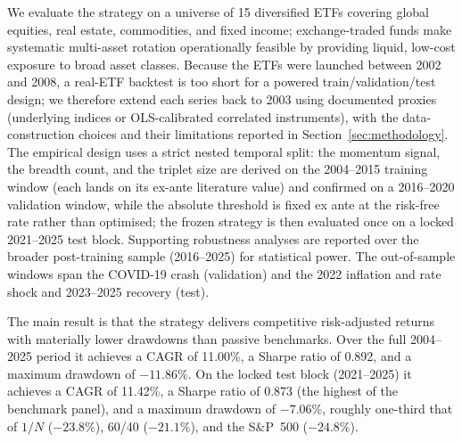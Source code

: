 We evaluate the strategy on a universe of 15 diversified ETFs covering global
equities, real estate, commodities, and fixed income; exchange-traded funds make
systematic multi-asset rotation operationally feasible by providing liquid,
low-cost exposure to broad asset classes.
Because the ETFs were launched between 2002 and 2008, a real-ETF backtest is too
short for a powered train/validation/test design; we therefore extend each series
back to 2003 using documented proxies (underlying indices or OLS-calibrated
correlated instruments), with the data-construction choices and their limitations
reported in Section~\ref{sec:methodology}.
The empirical design uses a strict nested temporal split: the momentum signal, the
breadth count, and the triplet size are derived on the 2004--2015 training window
(each lands on its ex-ante literature value) and confirmed on a 2016--2020
validation window, while the absolute threshold is fixed ex ante at the risk-free
rate rather than optimised; the frozen strategy is then evaluated once on a locked
2021--2025 test block. Supporting robustness analyses are reported over the broader
post-training sample (2016--2025) for statistical power.
The out-of-sample windows span the COVID-19 crash (validation) and the 2022
inflation and rate shock and 2023--2025 recovery (test).

The main result is that the strategy delivers competitive risk-adjusted returns
with materially lower drawdowns than passive benchmarks.
Over the full 2004--2025 period it achieves a CAGR of 11.00\%, a Sharpe ratio of
0.892, and a maximum drawdown of $-11.86\%$.
On the locked test block (2021--2025) it achieves a CAGR of 11.42\%, a Sharpe ratio
of 0.873 (the highest of the benchmark panel), and a maximum drawdown of $-7.06\%$,
roughly one-third that of $1/N$ ($-23.8\%$), 60/40 ($-21.1\%$), and the S\&P~500
($-24.8\%$).

